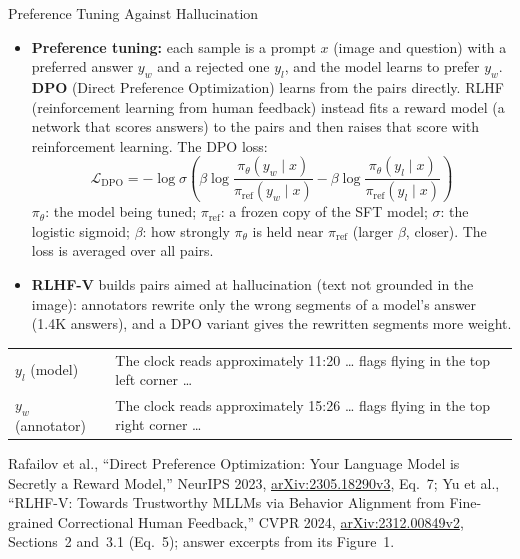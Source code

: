 \begin{frame}{Preference Tuning Against Hallucination}
  \begin{itemize}\footnotesize\itemsep0.3em
    \item \textbf{Preference tuning:} each sample is a prompt $x$ (image and question) with a preferred answer $y_w$ and a rejected one $y_l$, and the model learns to prefer $y_w$. \textbf{DPO} (Direct Preference Optimization) learns from the pairs directly. RLHF (reinforcement learning from human feedback) instead fits a reward model (a network that scores answers) to the pairs and then raises that score with reinforcement learning. The DPO loss:
    \[ \mathcal{L}_{\text{DPO}} = -\log \sigma\!\left(\beta \log \frac{\pi_\theta(y_w \mid x)}{\pi_{\text{ref}}(y_w \mid x)} - \beta \log \frac{\pi_\theta(y_l \mid x)}{\pi_{\text{ref}}(y_l \mid x)}\right) \]
    $\pi_\theta$: the model being tuned; $\pi_{\text{ref}}$: a frozen copy of the SFT model; $\sigma$: the logistic sigmoid; $\beta$: how strongly $\pi_\theta$ is held near $\pi_{\text{ref}}$ (larger $\beta$, closer). The loss is averaged over all pairs.
    \item \textbf{RLHF-V} builds pairs aimed at hallucination (text not grounded in the image): annotators rewrite only the wrong segments of a model's answer (1.4K answers), and a DPO variant gives the rewritten segments more weight.
  \end{itemize}
  \vspace{0.2em}
  {\centering\scriptsize
  \begin{tabular}{p{1.9cm} p{10.4cm}}
    \toprule
    $y_l$ (model) & The clock reads approximately \textcolor{red!75!black}{11:20} \ldots{} flags flying in the top \textcolor{red!75!black}{left} corner \ldots \\
    \addlinespace[0.2em]
    $y_w$ (annotator) & The clock reads approximately \textcolor{green!45!black}{15:26} \ldots{} flags flying in the top \textcolor{green!45!black}{right} corner \ldots \\
    \bottomrule
  \end{tabular}\par}
  \vspace{0.3em}
  {\scriptsize Rafailov et al., ``Direct Preference Optimization: Your Language Model is Secretly a Reward Model,'' NeurIPS 2023, \href{https://arxiv.org/abs/2305.18290v3}{arXiv:2305.18290v3}, Eq.~7; Yu et al., ``RLHF-V: Towards Trustworthy MLLMs via Behavior Alignment from Fine-grained Correctional Human Feedback,'' CVPR 2024, \href{https://arxiv.org/abs/2312.00849v2}{arXiv:2312.00849v2}, Sections~2 and~3.1 (Eq.~5); answer excerpts from its Figure~1.\par}
\end{frame}

